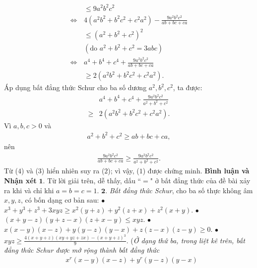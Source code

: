 \begin{multicols}{2}
\begin{align*}
		&\le 9{a^2}{b^2}{c^2}\\
		\Leftrightarrow\,& 4\left( {{a^2}{b^2} + {b^2}{c^2} + {c^2}{a^2}} \right) - \frac{{9{a^2}{b^2}{c^2}}}{{ab + bc + ca}} \\
		&\le {\left( {{a^2} + {b^2} + {c^2}} \right)^2}\\
		&(\text{do } {a^2} + {b^2} + {c^2} = 3abc)\\
		\Leftrightarrow\,& {a^4} + {b^4} + {c^4} + \frac{{9{a^2}{b^2}{c^2}}}{{ab + bc + ca}} \\
		&\ge 2\left( {{a^2}{b^2} + {b^2}{c^2} + {c^2}{a^2}} \right). \tag{$2$}
	\end{align*}	
	Áp dụng bất đẳng thức Schur cho ba số dương $a^2,b^2,c^2$, ta được:
	\begin{align*}
		&{a^4} + {b^4} + {c^4} + \frac{{9{a^2}{b^2}{c^2}}}{{{a^2} + {b^2} + {c^2}}}\\ 
		\ge &2\left( {{a^2}{b^2} + {b^2}{c^2} + {c^2}{a^2}} \right).
	\end{align*}
	Vì $a, b, c > 0$ và
	\begin{align*}
		{a^2} + {b^2} + {c^2} \ge ab + bc + ca,
	\end{align*}
	nên
	\begin{align*}
		\frac{{9{a^2}{b^2}{c^2}}}{{ab + bc + ca}} \ge \frac{{9{a^2}{b^2}{c^2}}}{{{a^2} + {b^2} + {c^2}}}. \tag{$4$}
	\end{align*}
	Từ ($4$) và ($3$) hiển nhiên suy ra ($2$); vì vậy, ($1$) được chứng minh.
	\vskip 0.05cm
	\textbf{\color{thachthuctoanhoc}Bình luận và Nhận xét}
	\vskip 0.05cm
	$\pmb{1.}$ Từ lời giải trên, dễ thấy, dấu ``$=$" ở bất đẳng thức của đề bài xảy ra khi và chỉ khi $a = b = c = 1$.
	\vskip 0.05cm
	$\pmb{2.}$ \textit{Bất đẳng thức Schur}, cho ba số thực không âm $x, y, z$, có bốn dạng cơ bản sau:
	\vskip 0.05cm
	$\bullet$ ${x^3} + {y^3} + {z^3} + 3xyz \ge {x^2}\left( {y + z} \right) + {y^2}\left( {z + x} \right) + {z^2}\left( {x + y} \right).$ 
	\vskip 0.05cm
	$\bullet$ $\left( {x + y - z} \right)\left( {y + z - x} \right)\left( {z + x - y} \right) \le xyz.$
	\vskip 0.05cm
	$\bullet$ $x\left( {x - y} \right)\left( {x - z} \right) + y\left( {y - z} \right)\left( {y - x} \right) + z\left( {z - x} \right)\left( {z - y} \right) \ge 0.$
	\vskip 0.05cm
	$\bullet$ $xyz \ge \frac{{4\left( {x + y + z} \right)\left( {xy + yz + zx} \right) - {{\left( {x + y + z} \right)}^3}}}{9}.$
	\vskip 0.05cm
	(\textit{Ở dạng thứ ba, trong liệt kê trên, bất đẳng thức Schur được mở rộng thành bất đẳng thức
	\begin{align*}
		&{x^r}\left( {x - y} \right)\left( {x - z} \right) + {y^r}\left( {y - z} \right)\left( {y - x} \right) \\

\end{align*}}
\end{multicols}
